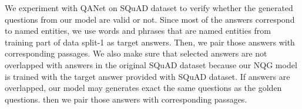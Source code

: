\documentclass[letterpaper]{article} %
\begin{document}
We experiment with QANet \cite{yu2018qanet} on SQuAD dataset to verify whether the generated questions from our model are valid or not. Since most of the answers correspond to named entities, we use words and phrases that are named entities from training part of data split-1 as target answers. Then, we pair those answers with corresponding passages. We also make sure that selected answers are not overlapped with answers in the original SQuAD dataset because our NQG model is trained with the target answer provided with SQuAD dataset. If answers are overlapped, our model may generates exact the same questions as the golden questions. then we pair those answers with corresponding passages.
% 
%    
% 
%  
% 
\end{document}
